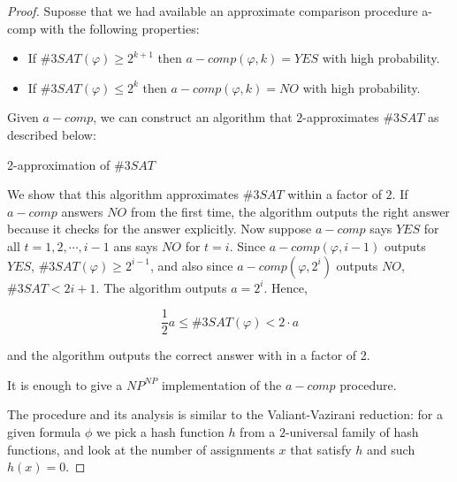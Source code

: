 \documentclass[12pt, a4paper]{article} %
\theoremstyle{definition}
\begin{document}
\begin{proof}
  Suposse that we had available an approximate comparison procedure a-comp with the following properties:

  \begin{itemize}
    \item If $\#3SAT(\varphi) \geq 2^{k+1}$ then $a- comp(\varphi, k) = YES$ with high probability.
    \item If $\#3SAT(\varphi) \leq 2^{k}$ then $a- comp(\varphi, k) = NO$ with high probability.
  \end{itemize}

  Given $a-comp$, we can construct an algorithm that $2$-approximates $\#3SAT$ as described below:

  \begin{algorithm}[H]
    \SetAlgoNoLine
    \Input{$\varphi$}
    \caption{2-approximation of $\#3SAT$}
    \label{2-approx}
  \end{algorithm}

  \newpage

  We show that this algorithm approximates $\#3SAT$ within a factor of $2$.
  If $a-comp$ answers $NO$ from the first time, the algorithm outputs the right answer because it checks for
  the answer explicitly. Now suppose $a-comp$ says $YES$ for all $t = 1,2,\cdots, i - 1$ ans says $NO$ for $t=i$.
  Since $a-comp(\varphi, i-1)$ outputs $YES$, $\#3SAT(\varphi) \geq 2^{i-1}$, and also since $a-comp(\varphi, 2^i)$ outputs $NO$, $\#3SAT < 2{i+1}$. The algorithm outputs $a = 2^i$. Hence,

  \begin{equation}\label{eq:3}
    \frac{1}{2}a \leq \#3SAT(\varphi) < 2 \cdot a
  \end{equation}

  and the algorithm outputs the correct answer with in a factor of 2.

  It is enough to give a $NP^{NP}$ implementation of the $a-comp$ procedure.

  The procedure and its analysis is similar to the Valiant-Vazirani reduction: for a given formula $\phi$ we pick a hash function $h$ from a $2$-universal family of hash functions, and look at the number of assignments $x$ that satisfy $h$ and such $h(x) = 0$.


\end{proof}
\end{document}
